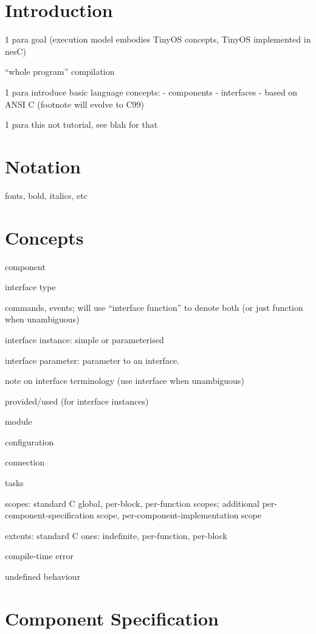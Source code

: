 \documentclass[11pt]{article}
\begin{document}
\section{Introduction}

1 para goal (execution model embodies TinyOS concepts, TinyOS implemented
in nesC)

``whole program'' compilation

1 para introduce basic language concepts:
- components
- interfaces
- based on ANSI C (footnote will evolve to C99)

1 para this not tutorial, see blah for that

\section{Notation}

fonts, bold, italics, etc

\section{Concepts}

component

interface type

commands, events; will use ``interface function'' to denote both (or just
function when unambiguous)

interface instance: simple or parameterised

interface parameter: parameter to an interface.

note on interface terminology (use interface when unambiguous)

provided/used (for interface instances)

module

configuration

connection

tasks

scopes: standard C global, per-block, per-function scopes; additional
per-component-specification scope, per-component-implementation scope

extents: standard C ones: indefinite, per-function, per-block

compile-time error

undefined behaviour

\section{Component Specification}
\end{document}
